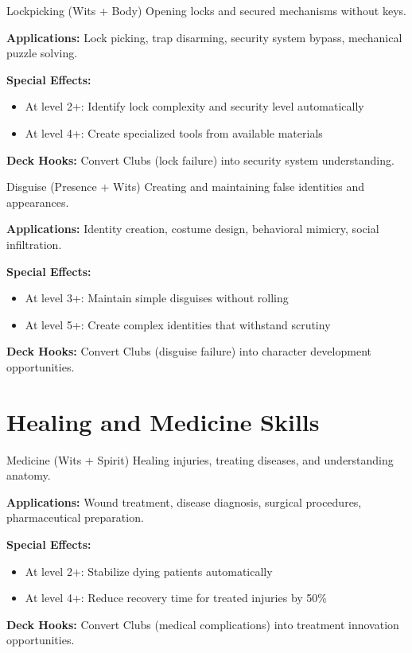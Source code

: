 \documentclass[11pt]{report}
\begin{document}
\begin{skillbox}{Lockpicking (Wits + Body)}
Opening locks and secured mechanisms without keys.

\textbf{Applications:} Lock picking, trap disarming, security system bypass, mechanical puzzle solving.

\textbf{Special Effects:}
\begin{itemize}
    \item At level 2+: Identify lock complexity and security level automatically
    \item At level 4+: Create specialized tools from available materials
\end{itemize}

\textbf{Deck Hooks:} Convert Clubs (lock failure) into security system understanding.
\end{skillbox}

\begin{skillbox}{Disguise (Presence + Wits)}
Creating and maintaining false identities and appearances.

\textbf{Applications:} Identity creation, costume design, behavioral mimicry, social infiltration.

\textbf{Special Effects:}
\begin{itemize}
    \item At level 3+: Maintain simple disguises without rolling
    \item At level 5+: Create complex identities that withstand scrutiny
\end{itemize}

\textbf{Deck Hooks:} Convert Clubs (disguise failure) into character development opportunities.
\end{skillbox}

\section{Healing and Medicine Skills}

\begin{skillbox}{Medicine (Wits + Spirit)}
Healing injuries, treating diseases, and understanding anatomy.

\textbf{Applications:} Wound treatment, disease diagnosis, surgical procedures, pharmaceutical preparation.

\textbf{Special Effects:}
\begin{itemize}
    \item At level 2+: Stabilize dying patients automatically
    \item At level 4+: Reduce recovery time for treated injuries by 50\%
\end{itemize}

\textbf{Deck Hooks:} Convert Clubs (medical complications) into treatment innovation opportunities.
\end{skillbox}
\end{document}
